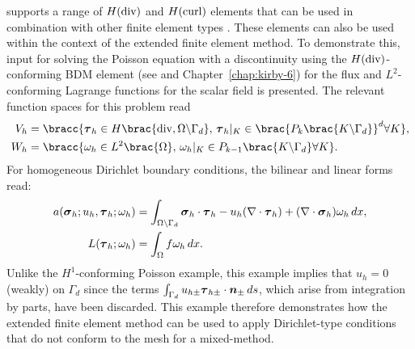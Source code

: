 \ffc{} supports a range of $H(\rm div)$ and $H(\rm curl)$ elements
that can be used in combination with other finite element types
\citep{RognesKirbyLogg2009}. These elements can also be used within the
context of the extended finite element method. To demonstrate this, \ufl{}
input for solving the Poisson equation with a discontinuity using the
$H(\rm div)$-conforming BDM element (see \citet{BrezziDouglasMarini1985}
and Chapter~\ref{chap:kirby-6}) for the flux and $L^{2}$-conforming Lagrange
functions for the scalar field is presented.  The relevant function
spaces for this problem read
%
\begin{align}
  V_{h} &= \bracc{\vect{\tau}_{h} \in H\brac{{\rm div}, \Omega\backslash\Gamma_{d}}, \,
         \vect{\tau}_{h}|_{K} \in \brac{P_{k}\brac{K \backslash \Gamma_{d}}}^{d} \forall K},
\label{eqn:nikbakht:BDM_space}
\\
  W_{h} &= \bracc{\omega_{h} \in L^{2}\brac{\Omega}, \,
         \omega_{h}|_{K} \in P_{k-1}\brac{K \backslash \Gamma_{d}}\forall K}.
\label{eqn:nikbakht:DG_space}
\end{align}
%
For homogeneous Dirichlet boundary conditions, the bilinear and linear
forms read:
%
\begin{align}
  a(\boldsymbol{\sigma}_{h}; u_{h}, \boldsymbol{\tau}_{h}; \omega_{h})
    &= \int_{\Omega\backslash\Gamma_{d}} \boldsymbol{\sigma}_{h} \cdot  \boldsymbol{\tau}_{h}
        - u_{h} (\nabla \cdot \boldsymbol{\tau}_{h}) + (\nabla \cdot \boldsymbol{\sigma}_{h}) \omega_{h} \, d x,
\\
  L(\boldsymbol{\tau}_{h}; \omega_{h}) &= \int_{\Omega} f \omega_{h}  \, d x.
\end{align}
%
Unlike the $H^{1}$-conforming Poisson example, this example implies that
$u_{h} = 0$ (weakly) on $\Gamma_{d}$ since the terms $\int_{\Gamma_{d}}
u_{h\pm} \boldsymbol{\tau}_{h\pm} \cdot \boldsymbol{n}_{\pm} \, d s$, which arise
from integration by parts, have been discarded.  This example therefore
demonstrates how the extended finite element method can be used to
apply Dirichlet-type conditions that do not conform to the mesh for
a mixed-method.

